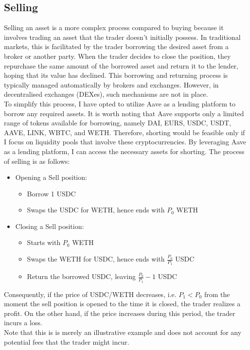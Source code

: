 \subsection{Selling}
Selling an asset is a more complex process compared to buying because it involves trading an asset that the trader doesn't initially possess. In traditional markets, this is facilitated by the trader borrowing the desired asset from a broker or another party. When the trader decides to close the position, they repurchase the same amount of the borrowed asset and return it to the lender, hoping that its value has declined. This borrowing and returning process is typically managed automatically by brokers and exchanges. However, in decentralised exchanges (DEXes), such mechanisms are not in place.
\\[3mm]
To simplify this process, I have opted to utilize Aave as a lending platform to borrow any required assets. It is worth noting that Aave supports only a limited range of tokens available for borrowing, namely DAI, EURS, USDC, USDT, AAVE, LINK, WBTC, and WETH. Therefore, shorting would be feasible only if I focus on liquidity pools that involve these cryptocurrencies. By leveraging Aave as a lending platform, I can access the necessary assets for shorting. The process of selling is as follows:
\begin{itemize}
    \item Opening a Sell position:\begin{itemize}
        \item Borrow 1 USDC
        \item Swaps the USDC for WETH, hence ends with $P_0$ WETH
    \end{itemize}
    \item Closing a Sell position:\begin{itemize}
        \item Starts with $P_0$ WETH
        \item Swaps the WETH for USDC, hence ends with $\frac{P_0}{P_1}$ USDC
        \item Return the borrowed USDC, leaving $\frac{P_0}{P_1} - 1$ USDC
    \end{itemize}
\end{itemize}
Consequently, if the price of USDC/WETH decreases, i.e. $P_1 < P_0$ from the moment the sell position is opened to the time it is closed, the trader realizes a profit. On the other hand, if the price increases during this period, the trader incurs a loss.
\\[3mm]
Note that this is is merely an illustrative example and does not account for any potential fees that the trader might incur.


